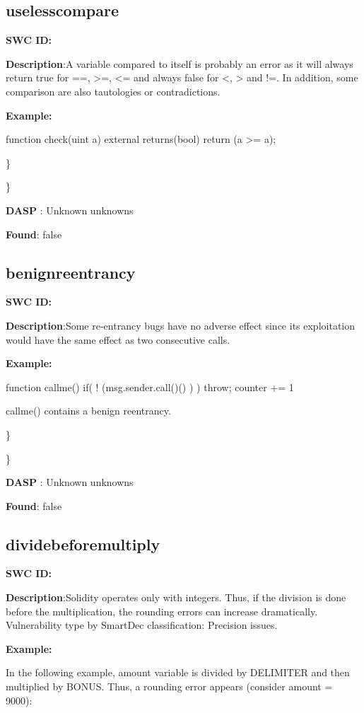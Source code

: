 \documentclass{article}
\begin{document}
{\subsection{useless\textunderscore compare} 
\textbf{SWC \textunderscore ID:} 

\textbf{Description}:A variable compared to itself is probably an error as it will always return true for ==, >=, <= and always false for <, > and !=. In addition, some comparison are also tautologies or contradictions.


\textbf{Example:} 

function check(uint a) external returns(bool){
    return (a >= a);
}

\} 

\} 

\textbf{DASP} : Unknown unknowns

\textbf{Found}: false

\subsection{benign\textunderscore reentrancy} 
\textbf{SWC \textunderscore ID:} 

\textbf{Description}:Some re-entrancy bugs have no adverse effect since its exploitation would have the same effect as two consecutive calls.


\textbf{Example:} 

function callme(){
  if( ! (msg.sender.call()() ) ){
    throw;
  }
  counter += 1
}

callme() contains a benign reentrancy.

\} 

\} 

\textbf{DASP} : Unknown unknowns

\textbf{Found}: false

\subsection{divide\textunderscore before\textunderscore multiply} 
\textbf{SWC \textunderscore ID:} 

\textbf{Description}:Solidity operates only with integers. Thus, if the division is done before the multiplication, the rounding errors can increase dramatically. Vulnerability type by SmartDec classification: Precision issues.


\textbf{Example:} 

In the following example, amount variable is divided by DELIMITER and then multiplied by BONUS. Thus, a rounding error appears (consider amount = 9000):

}
\end{document}
